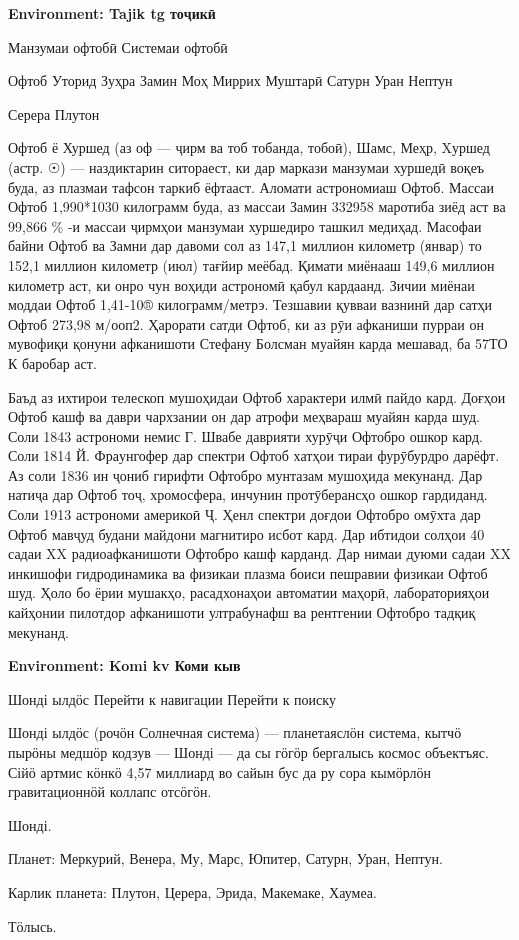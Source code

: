 \documentclass{article}
\begin{document}
\bigskip
{\forig \bfseries Environment: Tajik tg тоҷикӣ}\par
\begin{cyrtranse}
Манзумаи офтобӣ
Системаи офтобӣ

    Офтоб
    Уторид
    Зуҳра
    Замин
    Моҳ
    Миррих
    Муштарӣ
    Сатурн
    Уран
    Нептун

    Серера
    Плутон
    
    Офтоб ё Хуршед (аз оф — ҷирм ва тоб тобанда, тобоӣ), Шамс, Меҳр, Xуршед (астр. ☉) — наздиктарин ситораест, ки дар маркази манзумаи хуршедӣ воқеъ буда, аз плазмаи тафсон таркиб ёфтааст. Аломати астрономиаш Офтоб. Массаи Офтоб 1,990*1030 килограмм буда, аз массаи Замин 332958 маротиба зиёд аст ва 99,866 \% -и массаи ҷирмҳои манзумаи хуршедиро ташкил медиҳад. Масофаи байни Офтоб ва Замни дар давоми сол аз 147,1 миллион километр (январ) то 152,1 миллион километр (июл) тағйир меёбад. Қимати миёнааш 149,6 миллион километр аст, ки онро чун воҳиди астрономӣ қабул кардаанд. Зичии миёнаи моддаи Офтоб 1,41-10® килограмм/метрэ. Тезшавии қувваи вазнинӣ дар сатҳи Офтоб 273,98 м/ооп2. Ҳарорати сатди Офтоб, ки аз рӯи афканиши пурраи он мувофиқи қонуни афканишоти Стефану Болс­ман муайян карда мешавад, ба 57ТО К баробар аст.

Баъд аз ихтирои телескоп мушоҳидаи Офтоб характери илмӣ пайдо кард. Доғҳои Офтоб кашф ва даври чархзании он дар атрофи меҳвараш муайян карда шуд. Соли 1843 астрономи немис Г. Швабе даврияти хурӯҷи Офтобро ошкор кард. Соли 1814 Й. Фра­унгофер дар спектри Офтоб хатҳои тираи фурӯбурдро дарёфт. Аз соли 1836 ин ҷониб гирифти Офтобро мунтазам мушоҳида мекунанд. Дар натиҷа дар Офтоб тоҷ, хромосфера, инчунин протӯберансҳо ошкор гарди­данд. Соли 1913 астрономи америкоӣ Ҷ. Ҳенл спектри доғдои Офтобро омӯхта дар Офтоб мавҷуд будани майдони магнитиро исбот кард. Дар ибтидои солҳои 40 садаи XX радиоафканишоти Офтобро кашф карданд. Дар нимаи дуюми садаи XX инкишофи гидродинамика ва физикаи плазма боиси пешравии физикаи Офтоб шуд. Ҳоло бо ёрии мушакҳо, расадхонаҳои автоматии маҳорӣ, лабораторияҳои кайҳонии пилотдор афканишоти ултрабунафш ва рентгении Офтобро тадқиқ мекунанд.
\end{cyrtranse}

\bigskip
{\forig \bfseries Environment: Komi kv Коми кыв}\par
\begin{cyrtranse}
Шонді ылдӧс
Перейти к навигации
Перейти к поиску

Шонді ылдӧс (рочӧн Солнечная система) — планетаяслӧн система, кытчӧ пырӧны медшӧр кодзув — Шонді — да сы гӧгӧр бергалысь космос объектъяс. Сійӧ артмис кӧнкӧ 4,57 миллиард во сайын бус да ру сора кымӧрлӧн гравитационнӧй коллапс отсӧгӧн.

Шонді.

Планет: Меркурий, Венера, Му, Марс, Юпитер, Сатурн, Уран, Нептун.

Карлик планета: Плутон, Церера, Эрида, Макемаке, Хаумеа.

Тӧлысь. 
\end{cyrtranse}
\end{document}

